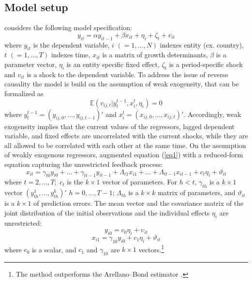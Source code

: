 \documentclass[a4paper]{article}
\begin{document}
\subsection{Model setup}
\noindent \citet{Moral+2016} considers the following model specification:
\begin{equation}\label{eq1}
    y_{it}=\alpha y_{it-1}+\beta x_{it}+\eta_{i}+\zeta_{t}+v_{it}
\end{equation}
\noindent where $y_{it}$ is the dependent variable, $i$ $(=1,...,N)$ indexes entity (ex. country), $t$ $(=1,...,T)$ indexes time, $x_{it}$ is a matrix of growth determinants, $\beta$ is a parameter vector, $\eta_{i}$ is an entity specific fixed effect, $\zeta_{t}$ is a period-specific shock and $v_{it}$ is a shock to the dependent variable.
To address the issue of reverse causality the model is build on the assumption of weak exogeneity, that can be formalized as
\begin{equation}\label{eq2}
    \mathbb{E}(v_{ij,t}|y^{t-1}_{t},x^{t}_{i},\eta_{i})=0
\end{equation}
\noindent where $y^{t-1}_{t}=(y_{ij,0},...,y_{ij,t-1})'$ and $x^t_{i}=(x_{ij,0},...,x_{ij,t})'$.
Accordingly, weak exogeneity implies that the current values of the regressors, lagged dependent variable, and fixed effects are uncorrelated with the current shocks, while they are all allowed to be correlated with each other at the same time.
On the assumption of weakly exogenous regressors, \citet{Moral+2013} augmented equation (\ref{eq1}) with a reduced-form equation capturing the unrestricted feedback process:
\begin{equation}\label{eq3}
x_{it}=\gamma_{t0}y_{i0}+...+\gamma_{tt-1}y_{it-1}+\Lambda_{t1}x_{i1}+...+\Lambda_{tt-1}x_{it-1}+c_{t}\eta_{i}+\vartheta_{it}
\end{equation}
\noindent where $t=2,\dots ,T;$ $c_{t}$ is the $k\times 1$ vector of parameters.
For $h<t$, $\gamma_{th}$ is a $k\times 1$ vector $(y_{th}^{1},\dots,y_{th}^{k})'$  $h=0,\dots,T-1$; $\Lambda_{th}$ is a $k\times k$ matrix of parameters, and $\vartheta_{it}$ is a $k\times 1$ of prediction errors.
The mean vector and the covariance matrix of the joint distribution of the initial observations and the individual effects $\eta_{i}$ are unrestricted:
\begin{equation}\label{eq4}
    y_{i0}=c_{0}\eta_{i}+\upsilon_{it}
\end{equation}
\begin{equation}\label{eq5}
    x_{i1}=\gamma_{10}y_{i0}+c_{1}\eta_{i}+\vartheta_{it}
\end{equation}
\noindent where $c_{0}$ is a scalar, and $c_{1}$ and $\gamma_{10}$ are $k\times 1$ vectors.\footnote{The method outperforms the Arellano--Bond estimator \citep{Moral+2019}.}
\end{document}
